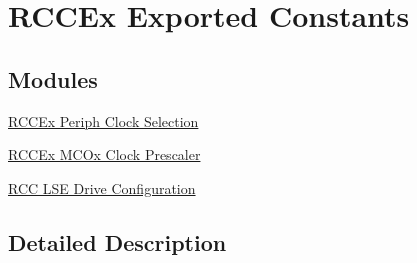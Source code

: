\hypertarget{group___r_c_c_ex___exported___constants}{}\section{R\+C\+C\+Ex Exported Constants}
\label{group___r_c_c_ex___exported___constants}
\subsection*{Modules}
\begin{DoxyCompactItemize}
\item 
\hyperlink{group___r_c_c_ex___periph___clock___selection}{R\+C\+C\+Ex Periph Clock Selection}
\item 
\hyperlink{group___r_c_c_ex___m_c_ox___clock___prescaler}{R\+C\+C\+Ex M\+C\+Ox Clock Prescaler}
\item 
\hyperlink{group___r_c_c_ex___l_s_e_drive___configuration}{R\+C\+C L\+S\+E Drive Configuration}
\end{DoxyCompactItemize}


\subsection{Detailed Description}
